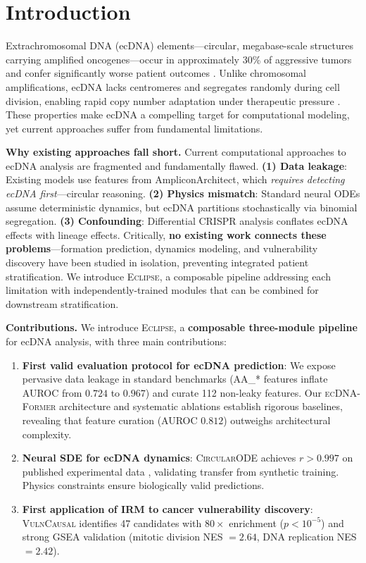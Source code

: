 \documentclass[runningheads]{llncs}
\newcommand{\eclipse}{\textsc{Eclipse}}
\newcommand{\former}{\textsc{ecDNA-Former}}
\newcommand{\circularode}{\textsc{CircularODE}}
\newcommand{\vulncausal}{\textsc{VulnCausal}}
\begin{document}
\section{Introduction}
\label{sec:intro}

Extrachromosomal DNA (ecDNA) elements---circular, megabase-scale structures carrying amplified oncogenes---occur in approximately 30\% of aggressive tumors and confer significantly worse patient outcomes \cite{kim_2020_ecdna_prognosis}. Unlike chromosomal amplifications, ecDNA lacks centromeres and segregates randomly during cell division, enabling rapid copy number adaptation under therapeutic pressure \cite{nathanson_2014_targeted, lange_2022_mathematical}. These properties make ecDNA a compelling target for computational modeling, yet current approaches suffer from fundamental limitations.

\textbf{Why existing approaches fall short.} Current computational approaches to ecDNA analysis are fragmented and fundamentally flawed. \textbf{(1) Data leakage}: Existing models use features from AmpliconArchitect, which \textit{requires detecting ecDNA first}---circular reasoning. \textbf{(2) Physics mismatch}: Standard neural ODEs assume deterministic dynamics, but ecDNA partitions stochastically via binomial segregation. \textbf{(3) Confounding}: Differential CRISPR analysis conflates ecDNA effects with lineage effects. Critically, \textbf{no existing work connects these problems}---formation prediction, dynamics modeling, and vulnerability discovery have been studied in isolation, preventing integrated patient stratification. We introduce \eclipse{}, a composable pipeline addressing each limitation with independently-trained modules that can be combined for downstream stratification.

\textbf{Contributions.} We introduce \eclipse{}, a \textbf{composable three-module pipeline} for ecDNA analysis, with three main contributions:
\begin{enumerate}[nosep,leftmargin=*]
\item \textbf{First valid evaluation protocol for ecDNA prediction}: We expose pervasive data leakage in standard benchmarks (AA\_* features inflate AUROC from $0.724$ to $0.967$) and curate 112 non-leaky features. Our \former{} architecture and systematic ablations establish rigorous baselines, revealing that feature curation (AUROC $0.812$) outweighs architectural complexity.
\item \textbf{Neural SDE for ecDNA dynamics}: \circularode{} achieves $r > 0.997$ on published experimental data \cite{lange_2022_mathematical}, validating transfer from synthetic training. Physics constraints ensure biologically valid predictions.
\item \textbf{First application of IRM to cancer vulnerability discovery}: \vulncausal{} identifies 47 candidates with $80\times$ enrichment ($p < 10^{-5}$) and strong GSEA validation (mitotic division NES $= 2.64$, DNA replication NES $= 2.42$).
\end{enumerate}
\end{document}
